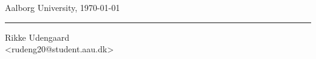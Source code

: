 \vspace{\baselineskip}\hfill Aalborg University, \today
\vfill\noindent
\vspace{3\baselineskip}
\begin{center}
\begin{minipage}[b]{0.45\textwidth}
 \centering
 \rule{\textwidth}{0.5pt}
  Rikke Udengaard\\
 {\footnotesize <rudeng20@student.aau.dk>}
\end{minipage}
\end{center}